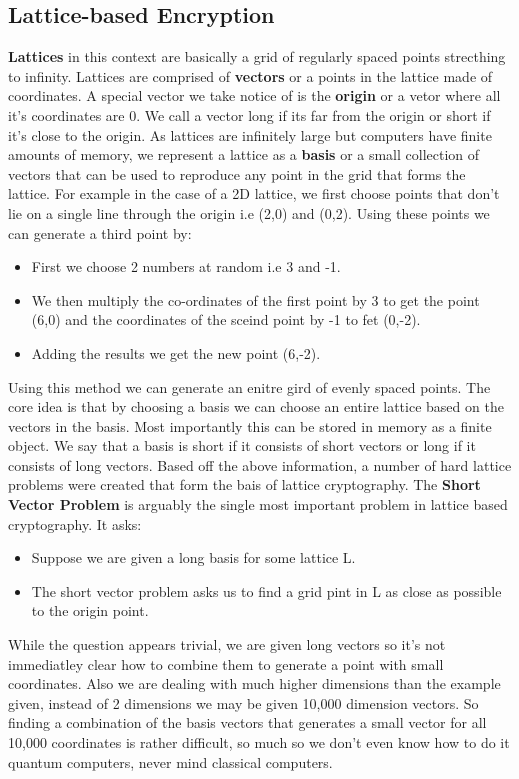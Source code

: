 \documentclass[10pt,a4paper]{article}
\begin{document}
\subsection{Lattice-based Encryption}
\textbf{Lattices} in this context are basically a grid of regularly spaced points strecthing to infinity. Lattices are comprised of \textbf{vectors} or a points in the lattice made of coordinates. A special vector we take notice of is the \textbf{origin} or a vetor where all it's coordinates are 0. We call a vector long if its far from the origin or short if it's close to the origin. As lattices are infinitely large but computers have finite amounts of memory, we represent a lattice as a \textbf{basis} or a small collection of vectors that can be used to reproduce any point in the grid that forms the lattice.
\newline
For example in the case of a 2D lattice, we first choose points that don't lie on a single line through the origin i.e (2,0) and (0,2). Using these points we can generate a third point by:
\begin{itemize}
\item First we choose 2 numbers at random i.e 3 and -1.
\item We then multiply the co-ordinates of the first point by 3 to get the point (6,0) and the coordinates of the sceind point by -1 to fet (0,-2).
\item Adding the results we get the new point (6,-2).
\end{itemize}
Using this method we can generate an enitre gird of evenly spaced points. The core idea is that by choosing a basis we can choose an entire lattice based on the vectors in the basis. Most importantly this can be stored in memory as a finite object. We say that a basis is short if it consists of short vectors or long if it consists of long vectors.
\newline
\newline
Based off the above information, a number of hard lattice problems were created that form the bais of lattice cryptography. The \textbf{Short Vector Problem} is arguably the single most important problem in lattice based cryptography. It asks:
\begin{itemize}
\item Suppose we are given a long basis for some lattice L.
\item The short vector problem asks us to find a grid pint in L as close as possible to the origin point.
\end{itemize}
While the question appears trivial, we are given long vectors so it's not immediatley clear how to combine them to generate a point with small coordinates. Also we are dealing with much higher dimensions than the example given, instead of 2 dimensions we may be given 10,000 dimension vectors. So finding a combination of the basis vectors that generates a small vector for all 10,000 coordinates is rather difficult, so much so we don't even know how to do it quantum computers, never mind classical computers.
\end{document}
